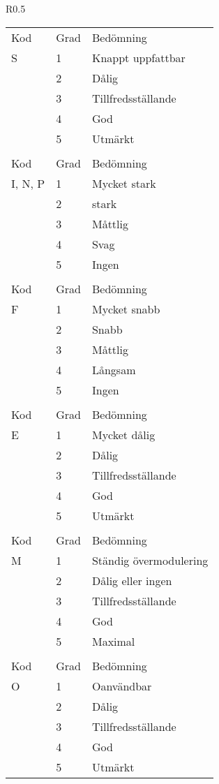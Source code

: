 \begin{wraptable}{R}{0.5\textwidth}
\begin{tabular}{lll}
  Kod & Grad & Bedömning \\
  S   & 1    & Knappt uppfattbar \\
      & 2    & Dålig \\
      & 3    & Tillfredsställande \\
      & 4    & God \\
      & 5    & Utmärkt \\
  & & \\

  Kod     & Grad & Bedömning \\
  I, N, P & 1    & Mycket stark \\
          & 2    & stark \\
          & 3    & Måttlig \\
          & 4    & Svag \\
          & 5    & Ingen \\
  & & \\

  Kod & Grad & Bedömning \\
  F   & 1    & Mycket snabb \\
      & 2    & Snabb \\
      & 3    & Måttlig \\
      & 4    & Långsam \\
      & 5    & Ingen \\

  & & \\
  Kod & Grad & Bedömning \\
  E   & 1    & Mycket dålig \\
      & 2    & Dålig \\
      & 3    & Tillfredsställande \\
      & 4    & God \\
      & 5    & Utmärkt \\

  & & \\
  Kod & Grad & Bedömning \\
  M   & 1    & Ständig övermodulering \\
      & 2    & Dålig eller ingen \\
      & 3    & Tillfredsställande \\
      & 4    & God \\
      & 5    & Maximal \\

  & & \\
  Kod & Grad & Bedömning \\
  O   & 1    & Oanvändbar \\
      & 2    & Dålig \\
      & 3    & Tillfredsställande \\
      & 4    & God \\
      & 5    & Utmärkt \\
\end{tabular}
\end{wraptable}

